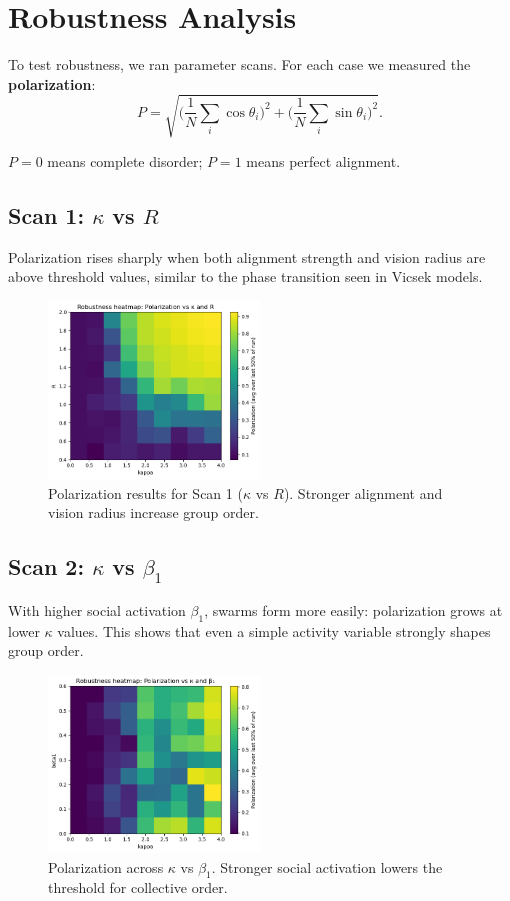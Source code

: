 \documentclass[11pt,a4paper]{article}
\begin{document}
\section{Robustness Analysis}

To test robustness, we ran parameter scans. For each case we measured the \textbf{polarization}:
\[
P = \sqrt{\Big(\frac{1}{N}\sum_i \cos \theta_i\Big)^2 + \Big(\frac{1}{N}\sum_i \sin \theta_i\Big)^2}.
\]

$P=0$ means complete disorder; $P=1$ means perfect alignment.

\subsection{Scan 1: $\kappa$ vs $R$}
Polarization rises sharply when both alignment strength and vision radius are above threshold values, similar to the phase transition seen in Vicsek models.

\begin{figure}[H]
    \centering
    \includegraphics[width=0.5\textwidth]{k_vs_r.png}
    \caption{Polarization results for Scan 1 ($\kappa$ vs $R$). Stronger alignment and vision radius increase group order.}
    \label{fig:scan1}
\end{figure}

\subsection{Scan 2: $\kappa$ vs $\beta_1$}
With higher social activation $\beta_1$, swarms form more easily: polarization grows at lower $\kappa$ values. This shows that even a simple activity variable strongly shapes group order.

\begin{figure}[H]
    \centering
    \includegraphics[width=0.5\textwidth]{k_vs_b1.png}
    \caption{Polarization across $\kappa$ vs $\beta_1$. Stronger social activation lowers the threshold for collective order.}
    \label{fig:scan2}
\end{figure}
\end{document}
